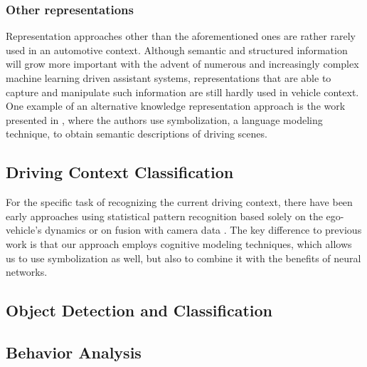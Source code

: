 \subsubsection{Other representations}
Representation approaches other than the aforementioned ones are rather rarely used in an automotive context.
Although semantic and structured information will grow more important with the advent of numerous and increasingly complex machine learning driven assistant systems, representations that are able to capture and manipulate such information are still hardly used in vehicle context.
One example of an alternative knowledge representation approach is the work presented in \cite{Yamazaki2016}, where the authors use symbolization, a language modeling technique, to obtain semantic descriptions of driving scenes.

\subsection{Driving Context Classification}
For the specific task of recognizing the current driving context, there have been early approaches using statistical pattern recognition based solely on the ego-vehicle's dynamics \cite{Engstrom2001} or on fusion with camera data \cite{Hauptmann1996}.
The key difference to previous work is that our approach employs cognitive modeling techniques, which allows us to use symbolization as well, but also to combine it with the benefits of neural networks.

\subsection{Object Detection and Classification}
\label{subsec:obj_detect}
\subsection{Behavior Analysis}
\label{subsec:behav_analysis}

